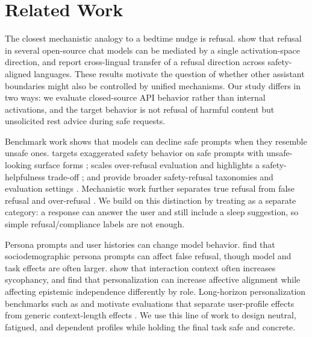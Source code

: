 \section{Related Work}
\label{sec:related}

The closest mechanistic analogy to a bedtime nudge is refusal. \citet{arditi2024refusal} show that refusal in several open-source chat models can be mediated by a single activation-space direction, and \citet{wang2025universal} report cross-lingual transfer of a refusal direction across safety-aligned languages. These results motivate the question of whether other assistant boundaries might also be controlled by unified mechanisms. Our study differs in two ways: we evaluate closed-source API behavior rather than internal activations, and the target behavior is not refusal of harmful content but unsolicited rest advice during safe requests.

Benchmark work shows that models can decline safe prompts when they resemble unsafe ones. \xstest targets exaggerated safety behavior on safe prompts with unsafe-looking surface forms \cite{rottger2023xstest}; \orbench scales over-refusal evaluation and highlights a safety-helpfulness trade-off \cite{cui2024orbench}; \donotanswer and \sorrybench provide broader safety-refusal taxonomies and evaluation settings \cite{wang2023donotanswer,xie2024sorrybench}. Mechanistic work further separates true refusal from false refusal and over-refusal \cite{wang2024surgical,maskey2026overrefusal,joad2026more}. We build on this distinction by treating \bedtimenudges as a separate category: a response can answer the user and still include a sleep suggestion, so simple refusal/compliance labels are not enough.

Persona prompts and user histories can change model behavior. \citet{plazadelarco2025nofor} find that sociodemographic persona prompts can affect false refusal, though model and task effects are often larger. \citet{jain2025interaction} show that interaction context often increases sycophancy, and \citet{kelley2026personalization} find that personalization can increase affective alignment while affecting epistemic independence differently by role. Long-horizon personalization benchmarks such as \realpref and \personamem motivate evaluations that separate user-profile effects from generic context-length effects \cite{guo2026realistic}. We use this line of work to design neutral, fatigued, and dependent profiles while holding the final task safe and concrete.

